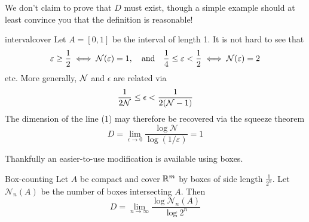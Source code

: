 We don't claim to prove that $D$ must exist, though a simple example should at least convince you that the definition is reasonable!

\begin{example}{}{intervalcover}
	Let $A=[0,1]$ be the interval of length 1. It is not hard to see that
	\[
		\varepsilon\ge\frac 12\iff \mathcal{N}(\varepsilon)=1,\quad\text{and}\quad \frac 14\le \varepsilon<\frac 12\iff \mathcal{N}(\varepsilon)=2
	\]
	etc. More generally, $\mathcal{N}$ and $\epsilon$ are related via
	\[
		\frac 1{2\mathcal{N}}\le\epsilon<\frac 1{2(\mathcal{N}-1)}
	\]
	The dimension of the line (1) may therefore be recovered via the squeeze theorem
	\[%
		D=\lim_{\epsilon\to 0}\frac{\log\mathcal N}{\log (1/\varepsilon)}=1
	\]
\end{example}



Thankfully an easier-to-use modification is available using boxes.

\begin{thm}{Box-counting}{}
	Let $A$ be compact and cover $\mathbb{R}^m$ by boxes of side length $\frac 1{2^n}$. Let $\mathcal N_n(A)$ be the number of boxes intersecting $A$. Then
	\[
		D=\lim_{n\to\infty}\frac{\log\mathcal N_n(A)}{\log 2^n}
	\]
\end{thm}


